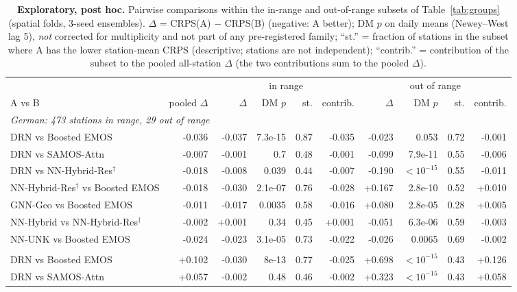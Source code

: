 \begin{table}[!htbp]
\centering
\caption{\textbf{Exploratory, post hoc.} Pairwise comparisons within the in-range and out-of-range subsets of Table~\ref{tab:groups} (spatial folds, 3-seed ensembles). $\Delta$ = CRPS(A) $-$ CRPS(B) (negative: A better); DM $p$ on daily means (Newey--West lag 5), \emph{not} corrected for multiplicity and not part of any pre-registered family; ``st.'' = fraction of stations in the subset where A has the lower station-mean CRPS (descriptive; stations are not independent); ``contrib.'' = contribution of the subset to the pooled all-station $\Delta$ (the two contributions sum to the pooled $\Delta$).}
\label{tab:range}
\scriptsize
\setlength{\tabcolsep}{3.5pt}
\begin{tabular}{lrrrrrrrrr}
\toprule
 & & \multicolumn{4}{c}{in range} & \multicolumn{4}{c}{out of range} \\
\cmidrule(lr){3-6}\cmidrule(lr){7-10}
A vs B & pooled $\Delta$ & $\Delta$ & DM $p$ & st. & contrib. & $\Delta$ & DM $p$ & st. & contrib. \\
\midrule
\multicolumn{10}{l}{\textit{German: 473 stations in range, 29 out of range}} \\
DRN vs Boosted EMOS & -0.036 & -0.037 & 7.3e-15 & 0.87 & -0.035 & -0.023 & 0.053 & 0.72 & -0.001 \\
DRN vs SAMOS-Attn & -0.007 & -0.001 & 0.7 & 0.48 & -0.001 & -0.099 & 7.9e-11 & 0.55 & -0.006 \\
DRN vs NN-Hybrid-Res$^\dagger$ & -0.018 & -0.008 & 0.039 & 0.44 & -0.007 & -0.190 & $<10^{-15}$ & 0.55 & -0.011 \\
NN-Hybrid-Res$^\dagger$ vs Boosted EMOS & -0.018 & -0.030 & 2.1e-07 & 0.76 & -0.028 & +0.167 & 2.8e-10 & 0.52 & +0.010 \\
GNN-Geo vs Boosted EMOS & -0.011 & -0.017 & 0.0035 & 0.58 & -0.016 & +0.080 & 2.8e-05 & 0.28 & +0.005 \\
NN-Hybrid vs NN-Hybrid-Res$^\dagger$ & -0.002 & +0.001 & 0.34 & 0.45 & +0.001 & -0.051 & 6.3e-06 & 0.59 & -0.003 \\
NN-UNK vs Boosted EMOS & -0.024 & -0.023 & 3.1e-05 & 0.73 & -0.022 & -0.026 & 0.0065 & 0.69 & -0.002 \\
\addlinespace
\multicolumn{10}{l}{\textit{EUPPBench: 96 stations in range, 21 out of range}} \\
DRN vs Boosted EMOS & +0.102 & -0.030 & 8e-13 & 0.77 & -0.025 & +0.698 & $<10^{-15}$ & 0.43 & +0.126 \\
DRN vs SAMOS-Attn & +0.057 & -0.002 & 0.48 & 0.46 & -0.002 & +0.323 & $<10^{-15}$ & 0.43 & +0.058 \\

\end{tabular}
\end{table}
